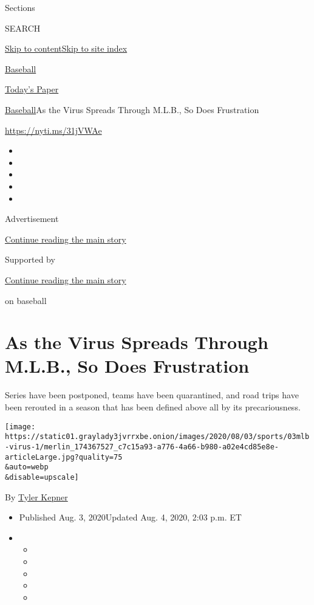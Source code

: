 Sections

SEARCH

\protect\hyperlink{site-content}{Skip to
content}\protect\hyperlink{site-index}{Skip to site index}

\href{https://www.nytimes3xbfgragh.onion/section/sports/baseball}{Baseball}

\href{https://myaccount.nytimes3xbfgragh.onion/auth/login?response_type=cookie\&client_id=vi}{}

\href{https://www.nytimes3xbfgragh.onion/section/todayspaper}{Today's
Paper}

\href{/section/sports/baseball}{Baseball}\textbar{}As the Virus Spreads
Through M.L.B., So Does Frustration

\url{https://nyti.ms/31jVWAe}

\begin{itemize}
\item
\item
\item
\item
\item
\end{itemize}

Advertisement

\protect\hyperlink{after-top}{Continue reading the main story}

Supported by

\protect\hyperlink{after-sponsor}{Continue reading the main story}

on baseball

\hypertarget{as-the-virus-spreads-through-mlb-so-does-frustration}{%
\section{As the Virus Spreads Through M.L.B., So Does
Frustration}\label{as-the-virus-spreads-through-mlb-so-does-frustration}}

Series have been postponed, teams have been quarantined, and road trips
have been rerouted in a season that has been defined above all by its
precariousness.

\texttt{[image: https://static01.graylady3jvrrxbe.onion/images/2020/08/03/sports/03mlb-virus-1/merlin\_174367527\_c7c15a93-a776-4a66-b980-a02e4cd85e8e-articleLarge.jpg?quality=75\\\&auto=webp\\\&disable=upscale]}

By \href{https://www.nytimes3xbfgragh.onion/by/tyler-kepner}{Tyler
Kepner}

\begin{itemize}
\item
  Published Aug. 3, 2020Updated Aug. 4, 2020, 2:03 p.m. ET
\item
  \begin{itemize}
  \item
  \item
  \item
  \item
  \item
  \end{itemize}
\end{itemize}

